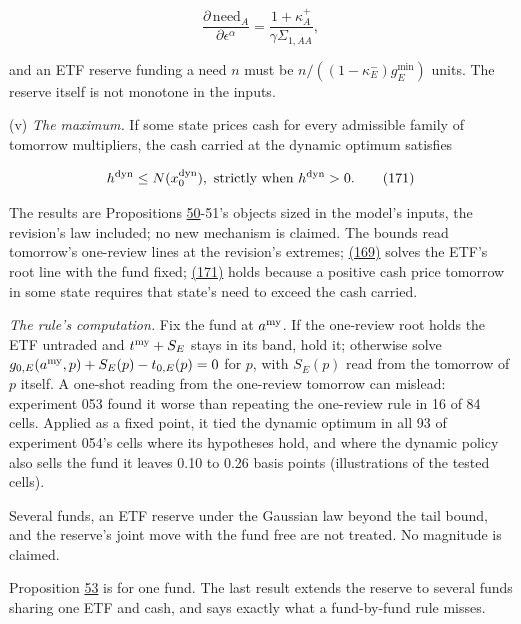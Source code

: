 \documentclass[11pt]{article}
\begin{document}
\begin{equation*}
\frac{\partial\,\mathrm{need}_A}{\partial\epsilon^\alpha}=\frac{1+\kappa^+_A}{\gamma\Sigma_{1,AA}},\tag{170}\label{eq:170}
\end{equation*}

and an ETF reserve funding a need \(n\) must be \(n/((1-\kappa^-_E)g^{\min}_E)\) units. The
reserve itself is not monotone in the inputs.

(v) \emph{The maximum.} If some state prices cash for every admissible family
of tomorrow multipliers, the cash carried at the dynamic optimum
satisfies

\begin{equation*}
h^{\rm dyn}\leq N(x^{\rm dyn}_0),\ \text{strictly when }h^{\rm dyn}>0.\tag{171}\label{eq:171}
\end{equation*}

The results are Propositions \hyperref[res:Proposition-50]{50}-51's objects sized in the model's
inputs, the revision's law included; no new mechanism is claimed. The
bounds read tomorrow's one-review lines at the revision's extremes;
\hyperref[eq:169]{(169)} solves the ETF's root line with the fund fixed; \hyperref[eq:171]{(171)} holds
because a positive cash price tomorrow in some state requires that
state's need to exceed the cash carried.

\emph{The rule's computation.} Fix the fund at \(a^{\rm my}\). If the one-review root
holds the ETF untraded and \(t^{\rm my}+S_E\) stays in its band, hold it;
otherwise solve \(g_{0,E}(a^{\rm my},p)+S_E(p)-t_{0,E}(p)=0\) for \(p\), with \(S_E(p)\) read
from the tomorrow of \(p\) itself. A one-shot reading from the one-review
tomorrow can mislead: experiment 053 found it worse than repeating the
one-review rule in 16 of 84 cells. Applied as a fixed point, it tied
the dynamic optimum in all 93 of experiment 054's cells where its
hypotheses hold, and where the dynamic policy also sells the fund it
leaves 0.10 to 0.26 basis points (illustrations of the tested cells).

Several funds, an ETF reserve under the Gaussian law beyond the tail
bound, and the reserve's joint move with the fund free are not treated.
No magnitude is claimed.

Proposition \hyperref[res:Proposition-53]{53} is for one fund. The last result extends the reserve
to several funds sharing one ETF and cash, and says exactly what a
fund-by-fund rule misses.
\end{document}
